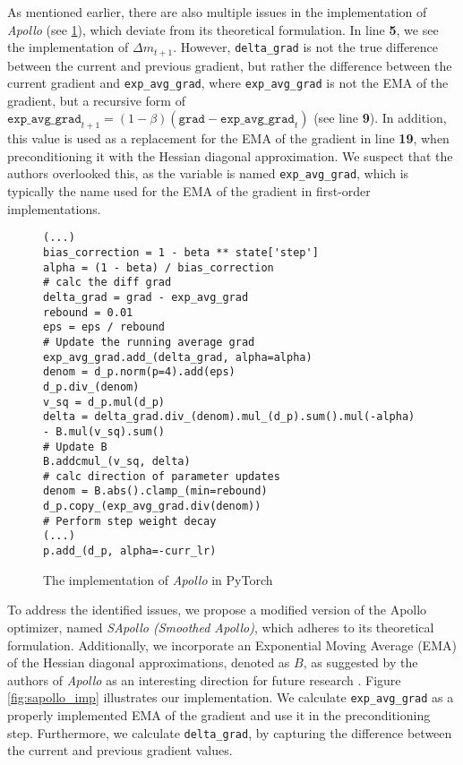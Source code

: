 As mentioned earlier, there are also multiple issues in the implementation of \emph{Apollo} (see \ref{fig:apollo_imp}),
which deviate from its theoretical formulation. In line \textbf{5}, we see the implementation of $\Delta m_{t+1}$.
However, \texttt{delta\_grad} is not the true difference between the current and previous gradient,
but rather the difference between the current gradient and \texttt{exp\_avg\_grad}, where \texttt{exp\_avg\_grad}
is not the EMA of the gradient, but a recursive form of $\texttt{exp\_avg\_grad}_{t+1} = (1-\beta) (\texttt{grad} - \texttt{exp\_avg\_grad}_{t})$ (see line \textbf{9}).
In addition, this value is used as a replacement for the EMA of the gradient in line \textbf{19}, when preconditioning it with the Hessian diagonal approximation.
We suspect that the authors overlooked this, as the variable is named \texttt{exp\_avg\_grad}, which is typically the name used for the EMA of the gradient in first-order implementations.
\begin{figure}[H]
\begin{verbatim}
(...)
bias_correction = 1 - beta ** state['step']
alpha = (1 - beta) / bias_correction
# calc the diff grad
delta_grad = grad - exp_avg_grad
rebound = 0.01
eps = eps / rebound
# Update the running average grad
exp_avg_grad.add_(delta_grad, alpha=alpha)
denom = d_p.norm(p=4).add(eps)
d_p.div_(denom)
v_sq = d_p.mul(d_p)
delta = delta_grad.div_(denom).mul_(d_p).sum().mul(-alpha) 
- B.mul(v_sq).sum()
# Update B
B.addcmul_(v_sq, delta)
# calc direction of parameter updates
denom = B.abs().clamp_(min=rebound)
d_p.copy_(exp_avg_grad.div(denom))
# Perform step weight decay
(...)
p.add_(d_p, alpha=-curr_lr)
\end{verbatim}
    \caption{The implementation of \emph{Apollo} in PyTorch}
    \label{fig:apollo_imp}
    \end{figure}
    To address the identified issues, we propose a modified version of the Apollo optimizer, named \emph{SApollo (Smoothed Apollo)}, which adheres to its theoretical formulation. Additionally, we incorporate an Exponential Moving Average (EMA) of the Hessian diagonal approximations, denoted as $B$, as suggested by the authors of \emph{Apollo} as an interesting direction for future research \cite{apollo}.
    Figure \ref{fig:sapollo_imp} illustrates our implementation. We calculate \texttt{exp\_avg\_grad} as a properly implemented EMA of the gradient and use it in the preconditioning step.
    Furthermore, we calculate \texttt{delta\_grad}, by capturing the difference between the current and previous gradient values.
